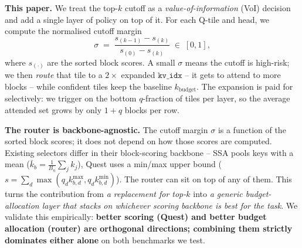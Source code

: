 \documentclass[11pt]{article}
\theoremstyle{remark}
\newcommand{\kbudget}{k_{\text{budget}}}
\begin{document}
\textbf{This paper.} We treat the top-$k$ cutoff as a \emph{value-of-information} (VoI) decision and add a single layer of policy on top of it. For each Q-tile and head, we compute the normalised cutoff margin
\[
\sigma \;=\; \frac{s_{(k-1)} - s_{(k)}}{s_{(0)} - s_{(k)}} \;\in\; [0,1],
\]
where $s_{(\cdot)}$ are the sorted block scores. A small $\sigma$ means the cutoff is high-risk; we then \emph{route} that tile to a $2\times$ expanded $\texttt{kv\_idx}$ -- it gets to attend to more blocks -- while confident tiles keep the baseline $\kbudget$. The expansion is paid for selectively: we trigger on the bottom $q$-fraction of tiles per layer, so the average attended set grows by only $1+q$ blocks per row.

\textbf{The router is backbone-agnostic.} The cutoff margin $\sigma$ is a function of the sorted block scores; it does not depend on how those scores are computed. Existing selectors differ in their block-scoring backbone -- SSA pools keys with a mean ($\bar k_b = \frac{1}{B_n}\sum_j k_j$), Quest uses a min/max upper bound ($s = \sum_d \max(q_d k^{\max}_{b,d}, q_d k^{\min}_{b,d})$). The router can sit on top of any of them. This turns the contribution from \emph{a replacement for top-$k$} into \emph{a generic budget-allocation layer that stacks on whichever scoring backbone is best for the task}. We validate this empirically: \textbf{better scoring (Quest) and better budget allocation (router) are orthogonal directions; combining them strictly dominates either alone} on both benchmarks we test.
\end{document}
